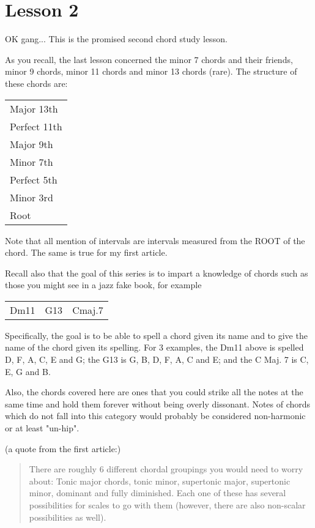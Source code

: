 \section{Lesson 2}

OK gang... This is the promised second chord study lesson.

As you recall, the last lesson concerned the minor 7 chords and their 
friends, minor 9 chords, minor 11 chords and minor 13 chords (rare).
The structure of these chords are:

\begin{center}
\begin{tabular}{ | l | }
	\hline
  Major 13th\\
  Perfect 11th\\
  Major 9th\\
  Minor 7th\\
  Perfect 5th\\
  Minor 3rd\\
	\hline
  Root\\
  \hline
\end{tabular}
\end{center}

Note that all mention of intervals are intervals measured from the ROOT 
of the chord. The same is true for my first article.

Recall also that the goal of this series is to impart a knowledge of 
chords such as those you might see in a jazz fake book, for example

\begin{center}
\begin{tabular}{ c c c }
  Dm11 & G13 & Cmaj.7\\
\end{tabular}
\end{center}

Specifically, the goal is to be able to spell a chord given its name and 
to give the name of the chord given its spelling. For 3 examples, the 
Dm11 above is spelled D, F, A, C, E and G; the G13 is G, B, D, F, A, C 
and E; and the C Maj. 7 is C, E, G and B.

Also, the chords covered here are ones that you could strike all the 
notes at the same time and hold them forever without being overly 
dissonant. Notes of chords which do not fall into this category would 
probably be considered non-harmonic or at least "un-hip".

(a quote from the first article:)

\begin{quote}
There are roughly 6 different chordal groupings you would need to worry about:
Tonic major chords, tonic minor, supertonic major, supertonic minor, dominant
and fully diminished. Each one of these has several possibilities for scales
to go with them (however, there are also non-scalar possibilities as well).
\end{quote}

